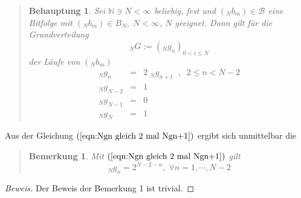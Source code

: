 \documentclass[11pt,oneside,a4paper]{scrreprt}
\newtheorem{beh}{Behauptung}
\newtheorem{bem}{Bemerkung}
\newenvironment{bew}{\begin{proof}[Beweis]}{\end{proof}}
\begin{document}
\begin{quote}
	\begin{beh}\label{beh:rekursiver NgN}
Sei $\mathbb N \ni N<\infty$ beliebig, fest und $(_Nb_m)\in\mathcal B$ eine Bitfolge mit $(_Nb_m)\in B_N,\;N<\infty$, $N$ geeignet. Dann gilt für die Grundverteilung \begin{equation}
_NG:=({_Ng}_n)_{0<i\leq N}
\end{equation}
der Läufe von $(_Nb_m)$
\begin{eqnarray}
_Ng_n&=& 2\; _Ng_{n+1}\;\;,\;\; 2\leq n<N-2 \label{eqn:Ngn gleich 2 mal Ngn+1}\\
_Ng_{N-2}&=&1 \label{eqn:g_NMinus2}\\
_Ng_{N-1}&=&0 \label{eqn:g_NMinus1}\\
_Ng_N&=&1 \label{eqn:g_N}
\end{eqnarray}
\end{beh}
\end{quote}
Aus der Gleichung $(\ref{eqn:Ngn gleich 2 mal Ngn+1})$ ergibt sich unmittelbar die 
\begin{quote}
	\begin{bem}
Mit $(\ref{eqn:Ngn gleich 2 mal Ngn+1})$ gilt
\begin{equation}
_Ng_n=2^{N-2-n},\; \forall n=1,\cdots,N-2
\end{equation}
\end{bem}
\end{quote}

\begin{bew} Der Beweis der Bemerkung 1 ist trivial.
\end{bew}
\end{document}
